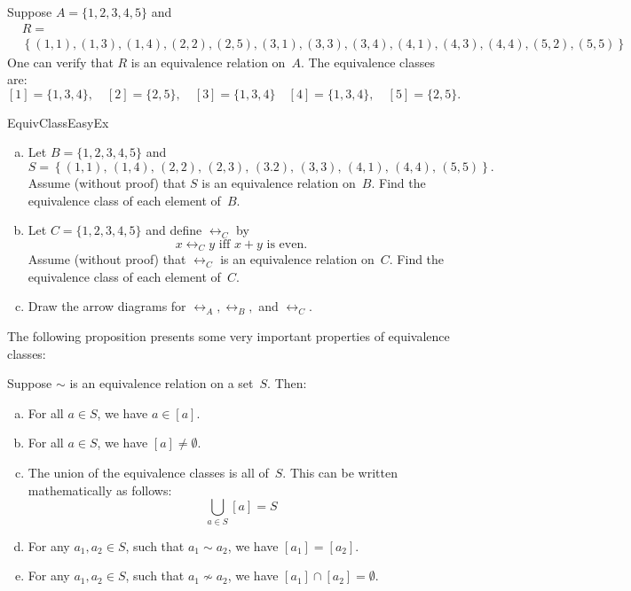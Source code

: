 \begin{eg} \label{EquivClassEg}
Suppose $A = \{1,2,3,4,5\}$ and 
\begin{align*}
&R = \\
&\left\{  (1,1), (1,3), (1,4), (2,2), (2,5), (3,1), (3,3), 
		(3,4), (4,1), (4,3), (4,4), (5,2), (5,5) 
\right\}
\end{align*}
One can verify that $R$ is an equivalence relation on~$A$. The equivalence classes are:
$$ [1] = \{1,3,4\},
\quad [2] = \{2,5\} ,
\quad [3] = \{1,3,4\} 
\quad[4] = \{1,3,4\} ,
\quad [5] = \{2,5\} .$$
\end{eg}


\begin{exercise}{EquivClassEasyEx}
\begin{enumerate}[(a)]
\item \label{EquivClassEasyEx-set}
Let $B = \{1,2,3,4,5\}$ and 
	$$S = \left\{ (1,1),\, (1,4),\, (2,2),\, (2,3),\, (3.2),\, 
		(3,3),\, (4,1),\, (4,4),\, (5,5)
		 \right\} .$$
Assume (without proof) that $S$ is an equivalence relation on~$B$. Find the equivalence class of each element of~$B$.


\item \label{EquivClassEasyEx-x+y}
Let $C = \{1,2,3,4,5\}$ and define $\rel_C$ by 
	$$ \text{$x \rel_C y$ iff $x + y$ is even.} $$
Assume (without proof) that $\rel_C$ is an equivalence relation on~$C$. Find the equivalence class of each element of~$C$.
\item
Draw the arrow diagrams for $\rel_A, \rel_B,$ and $\rel_C$.
\end{enumerate}
\end{exercise}


The following proposition presents some very important properties of equivalence classes:

\begin{thm} \label{EquivRelProps}
Suppose $\sim$ is an equivalence relation on a set~$S$. Then:
\begin{enumerate}[(a)]
\item \label{EquivRelProps-aIn[a]}
 For all $a \in S$, we have $a \in [a]$.
\item \label{EquivRelProps-nonempty}
 For all $a \in S$, we have $[a] \neq \emptyset$.
\item \label{EquivRelProps-union}
 The union of the equivalence classes is all of~$S$. This can be written mathematically as follows:
	$$ \bigcup_{a \in S} [a] = S$$
\item \label{EquivRelProps-equal}
 For any $a_1,a_2 \in S$, such that $a_1 \sim a_2$, we have $[a_1] = [a_2]$.
\item \label{EquivRelProps-disjoint}
 For any $a_1,a_2 \in S$, such that $a_1 \not\sim a_2$, we have $[a_1] \cap [a_2] = \emptyset$.
\end{enumerate}
\end{thm}

